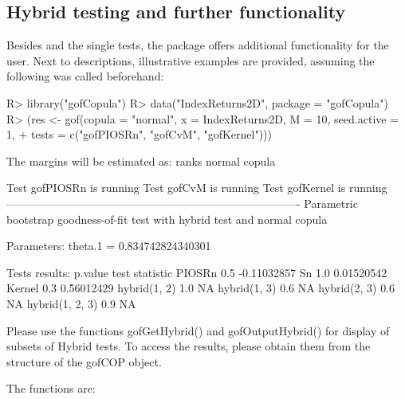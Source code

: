 \subsection{Hybrid testing and further functionality}\label{subsec:further_func}
Besides  and the single tests, the package  offers additional functionality for the user. Next to descriptions, illustrative examples are provided, assuming the following was called beforehand:
\begin{example}
R> library("gofCopula")
R> data("IndexReturns2D", package = "gofCopula")
R> (res <- gof(copula = "normal", x = IndexReturns2D, M = 10, seed.active = 1,
+              tests = c("gofPIOSRn", "gofCvM", "gofKernel")))
\end{example}
\mycolor \vspace{-0.15cm}
\begin{example}
The margins will be estimated as: ranks
normal copula
\end{example} 
\bk \vspace{-0.5cm}
\begin{example}
Test gofPIOSRn is running
Test gofCvM is running            
Test gofKernel is running                                                                       
-------------------------------------------------------------------------------
Parametric bootstrap goodness-of-fit test with hybrid test and normal copula

Parameters:
theta.1 = 0.834742824340301

Tests results:
                p.value test statistic
PIOSRn              0.5    -0.11032857
Sn                  1.0     0.01520542
Kernel              0.3     0.56012429
hybrid(1, 2)        1.0             NA
hybrid(1, 3)        0.6             NA
hybrid(2, 3)        0.6             NA
hybrid(1, 2, 3)     0.9             NA

Please use the functions gofGetHybrid() and gofOutputHybrid() for 
display of subsets of Hybrid tests. To access the results, please
obtain them from the structure of the gofCOP object.
\end{example}
\bigskip
The functions are:

